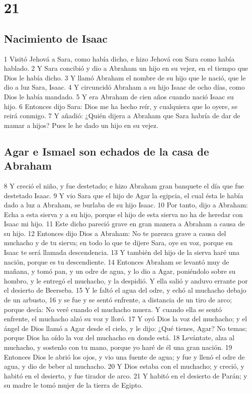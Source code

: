 \chapter{21}

\section{Nacimiento de Isaac}

1 Visitó Jehová a Sara, como había dicho, e hizo Jehová con Sara como había hablado.
2 Y Sara concibió y dio a Abraham un hijo en su vejez, en el tiempo que Dios le había dicho.
3 Y llamó Abraham el nombre de su hijo que le nació, que le dio a luz Sara, Isaac.
4 Y circuncidó Abraham a su hijo Isaac de ocho días, como Dios le había mandado.
5 Y era Abraham de cien años cuando nació Isaac su hijo.
6 Entonces dijo Sara: Dios me ha hecho reír, y cualquiera que lo oyere, se reirá conmigo.
7 Y añadió: ¿Quién dijera a Abraham que Sara habría de dar de mamar a hijos? Pues le he dado un hijo en su vejez.

\section{Agar e Ismael son echados de la casa de Abraham}

8 Y creció el niño, y fue destetado; e hizo Abraham gran banquete el día que fue destetado Isaac.
9 Y vio Sara que el hijo de Agar la egipcia, el cual ésta le había dado a luz a Abraham, se burlaba de su hijo Isaac.
10 Por tanto, dijo a Abraham: Echa a esta sierva y a su hijo, porque el hijo de esta sierva no ha de heredar con Isaac mi hijo.
11 Este dicho pareció grave en gran manera a Abraham a causa de su hijo.
12 Entonces dijo Dios a Abraham: No te parezca grave a causa del muchacho y de tu sierva; en todo lo que te dijere Sara, oye su voz, porque en Isaac te será llamada descendencia.
13 Y también del hijo de la sierva haré una nación, porque es tu descendiente.
14 Entonces Abraham se levantó muy de mañana, y tomó pan, y un odre de agua, y lo dio a Agar, poniéndolo sobre su hombro, y le entregó el muchacho, y la despidió. Y ella salió y anduvo errante por el desierto de Beerseba.
15 Y le faltó el agua del odre, y echó al muchacho debajo de un arbusto,
16 y se fue y se sentó enfrente, a distancia de un tiro de arco; porque decía: No veré cuando el muchacho muera. Y cuando ella se sentó enfrente, el muchacho alzó su voz y lloró.
17 Y oyó Dios la voz del muchacho; y el ángel de Dios llamó a Agar desde el cielo, y le dijo: ¿Qué tienes, Agar? No temas; porque Dios ha oído la voz del muchacho en donde está.
18 Levántate, alza al muchacho, y sostenlo con tu mano, porque yo haré de él una gran nación.
19 Entonces Dios le abrió los ojos, y vio una fuente de agua; y fue y llenó el odre de agua, y dio de beber al muchacho.
20 Y Dios estaba con el muchacho; y creció, y habitó en el desierto, y fue tirador de arco.
21 Y habitó en el desierto de Parán; y su madre le tomó mujer de la tierra de Egipto.

